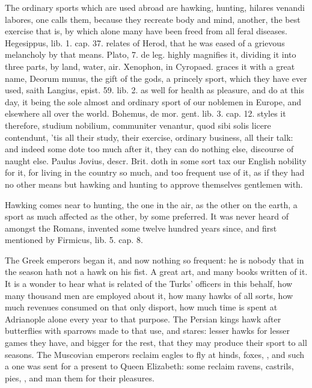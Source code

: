 {The ordinary sports which are used abroad are hawking, hunting, hilares
venandi labores, one calls them, because they recreate body and
mind, another, the best exercise that is, by which alone
many have been freed from all feral diseases. Hegesippus, lib. 1.
cap. 37. relates of Herod, that he was eased of a grievous melancholy
by that means. Plato, 7. de leg. highly magnifies it, dividing it into
three parts, by land, water, air. Xenophon, in Cyropaed. graces it with
a great name, Deorum munus, the gift of the gods, a princely sport,
which they have ever used, saith Langius, epist. 59. lib. 2. as well
for health as pleasure, and do at this day, it being the sole almost
and ordinary sport of our noblemen in Europe, and elsewhere all over
the world. Bohemus, de mor. gent. lib. 3. cap. 12. styles it therefore,
studium nobilium, communiter venantur, quod sibi solis licere
contendunt, 'tis all their study, their exercise, ordinary business,
all their talk: and indeed some dote too much after it, they can do
nothing else, discourse of naught else. Paulus Jovius, descr. Brit.
doth in some sort tax our  English nobility for it, for living in
the country so much, and too frequent use of it, as if they had no
other means but hawking and hunting to approve themselves gentlemen
with.

Hawking comes near to hunting, the one in the air, as the other on the
earth, a sport as much affected as the other, by some preferred.
It was never heard of amongst the Romans, invented some twelve
hundred years since, and first mentioned by Firmicus, lib. 5. cap. 8.

The Greek emperors began it, and now nothing so frequent: he is nobody
that in the season hath not a hawk on his fist. A great art, and many
books written of it. It is a wonder to hear what is related
of the Turks' officers in this behalf, how many thousand men are
employed about it, how many hawks of all sorts, how much revenues
consumed on that only disport, how much time is spent at Adrianople
alone every year to that purpose. The Persian kings hawk after
butterflies with sparrows made to that use, and stares: lesser hawks
for lesser games they have, and bigger for the rest, that they may
produce their sport to all seasons. The Muscovian emperors reclaim
eagles to fly at hinds, foxes, \etc{}, and such a one was sent for a
present to Queen Elizabeth: some reclaim ravens, castrils, pies,
\etc{}, and man them for their pleasures.

}
